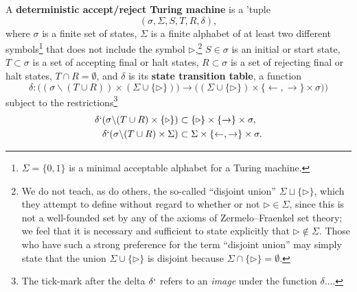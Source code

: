 \documentclass[letterpaper]{article}
\begin{document}
\begin{definition}
A \textbf{deterministic accept/reject Turing machine} is a 'tuple
\begin{equation}
(\sigma,\Sigma,S,T,R,\delta),\label{dtuple}
\end{equation}
where $\sigma$ is a finite set of states, $\Sigma$ is a finite alphabet of at least two different symbols\footnote{$\Sigma=\{0,1\}$ is a minimal acceptable alphabet for a Turing machine.} that does not include the symbol $\triangleright$,\footnote{We do not teach, as do others, the so-called ``disjoint union'' \mbox{$\Sigma\sqcup\{\triangleright\}$}, which they attempt to define without regard to whether or not \mbox{$\triangleright\in\Sigma$}, since this is not a well-founded set by any of the axioms of Zermelo--Fraenkel set theory; we feel that it is necessary and sufficient to state explicitly that \mbox{$\triangleright\notin\Sigma$}. Those who have such a strong preference for the term ``disjoint union'' may simply state that the union \mbox{$\Sigma\cup\{\triangleright\}$} is disjoint because \mbox{$\Sigma\cap\{\triangleright\}=\emptyset$}.} $S\in\sigma$ is an initial or start state, $T\subset\sigma$ is a set of accepting final or halt states, $R\subset\sigma$ is a set of rejecting final or halt states, $T\cap R=\emptyset$, and $\delta$ is its \textbf{state transition table}, a function
\begin{equation}
\delta:\big((\sigma\backslash(T\cup R))\times(\Sigma\cup\{\triangleright\})\big)\longrightarrow\big((\Sigma\cup\{\triangleright\})\times\{\leftarrow,\rightarrow\}\times\sigma)\big)
\end{equation}
subject to the restrictions\footnote{The tick-mark after the delta $\delta`$ refers to an \textit{image} under the function $\delta$....}
\begin{align}
\delta`(\sigma\backslash(T\cup R)\times\{\triangleright\})&\subset \{\triangleright\}\times\{\rightarrow\}\times\sigma,\label{noback}\\
\delta`(\sigma\backslash(T\cup R)\times\Sigma)&\subset \Sigma\times\{\leftarrow,\rightarrow\}\times\sigma.\label{abuse1}
\end{align}
\end{definition}
\end{document}
